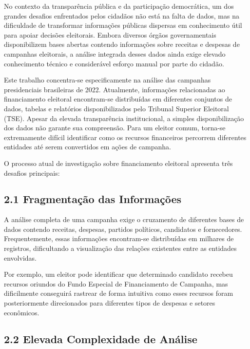 \documentclass[11pt]{article}
\begin{document}
No contexto da transparência pública e da participação democrática, um
dos grandes desafios enfrentados pelos cidadãos não está na falta de
dados, mas na dificuldade de transformar informações públicas dispersas
em conhecimento útil para apoiar decisões eleitorais. Embora diversos
órgãos governamentais disponibilizem bases abertas contendo informações
sobre receitas e despesas de campanhas eleitorais, a análise integrada
desses dados ainda exige elevado conhecimento técnico e considerável
esforço manual por parte do cidadão.

Este trabalho concentra-se especificamente na análise das campanhas
presidenciais brasileiras de 2022. Atualmente, informações relacionadas
ao financiamento eleitoral encontram-se distribuídas em diferentes
conjuntos de dados, tabelas e relatórios disponibilizados pelo Tribunal
Superior Eleitoral (TSE). Apesar da elevada transparência institucional,
a simples disponibilização dos dados não garante sua compreensão. Para
um eleitor comum, torna-se extremamente difícil identificar como os
recursos financeiros percorrem diferentes entidades até serem
convertidos em ações de campanha.

O processo atual de investigação sobre financiamento eleitoral apresenta
três desafios principais:

\subsection{2.1 Fragmentação das
Informações}\label{fragmentauxe7uxe3o-das-informauxe7uxf5es}

A análise completa de uma campanha exige o cruzamento de diferentes
bases de dados contendo receitas, despesas, partidos políticos,
candidatos e fornecedores. Frequentemente, essas informações
encontram-se distribuídas em milhares de registros, dificultando a
visualização das relações existentes entre as entidades envolvidas.

Por exemplo, um eleitor pode identificar que determinado candidato
recebeu recursos oriundos do Fundo Especial de Financiamento de
Campanha, mas dificilmente conseguirá rastrear de forma intuitiva como
esses recursos foram posteriormente direcionados para diferentes tipos
de despesas e setores econômicos.

\subsection{2.2 Elevada Complexidade de
Análise}\label{elevada-complexidade-de-anuxe1lise}
\end{document}
